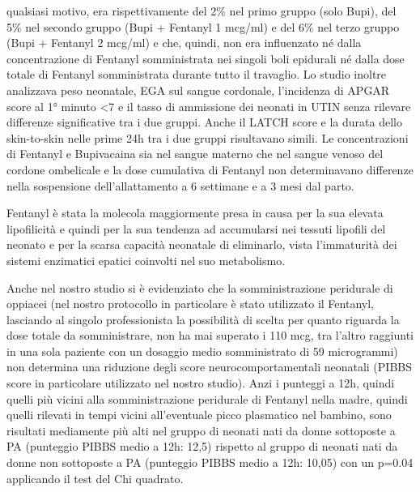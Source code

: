 \documentclass[]{article}
\begin{document}
qualsiasi motivo, era rispettivamente del 2\% nel primo gruppo (solo
Bupi), del 5\% nel secondo gruppo (Bupi + Fentanyl 1 mcg/ml) e del 6\%
nel terzo gruppo (Bupi + Fentanyl 2 mcg/ml) e che, quindi, non era
influenzato né dalla concentrazione di Fentanyl somministrata nei
singoli boli epidurali né dalla dose totale di Fentanyl somministrata
durante tutto il travaglio. Lo studio inoltre analizzava peso neonatale,
EGA sul sangue cordonale, l'incidenza di APGAR score al 1° minuto
\textless{}7 e il tasso di ammissione dei neonati in UTIN senza rilevare
differenze significative tra i due gruppi. Anche il LATCH score e la
durata dello skin-to-skin nelle prime 24h tra i due gruppi risultavano
simili. Le concentrazioni di Fentanyl e Bupivacaina sia nel sangue
materno che nel sangue venoso del cordone ombelicale e la dose
cumulativa di Fentanyl non determinavano differenze nella sospensione
dell'allattamento a 6 settimane e a 3 mesi dal parto.

Fentanyl è stata la molecola maggiormente presa in causa per la sua
elevata lipofilicità e quindi per la sua tendenza ad accumularsi nei
tessuti lipofili del neonato e per la scarsa capacità neonatale di
eliminarlo, vista l'immaturità dei sistemi enzimatici epatici coinvolti
nel suo metabolismo.

Anche nel nostro studio si è evidenziato che la somministrazione
peridurale di oppiacei (nel nostro protocollo in particolare è stato
utilizzato il Fentanyl, lasciando al singolo professionista la
possibilità di scelta per quanto riguarda la dose totale da
somministrare, non ha mai superato i 110 mcg, tra l'altro raggiunti in
una sola paziente con un dosaggio medio somministrato di 59 microgrammi)
non determina una riduzione degli score neurocomportamentali neonatali
(PIBBS score in particolare utilizzato nel nostro studio). Anzi i
punteggi a 12h, quindi quelli più vicini alla somministrazione
peridurale di Fentanyl nella madre, quindi quelli rilevati in tempi
vicini all'eventuale picco plasmatico nel bambino, sono risultati
mediamente più alti nel gruppo di neonati nati da donne sottoposte a PA
(punteggio PIBBS medio a 12h: 12,5) rispetto al gruppo di neonati nati
da donne non sottoposte a PA (punteggio PIBBS medio a 12h: 10,05) con un
p=0.04 applicando il test del Chi quadrato.
\end{document}
